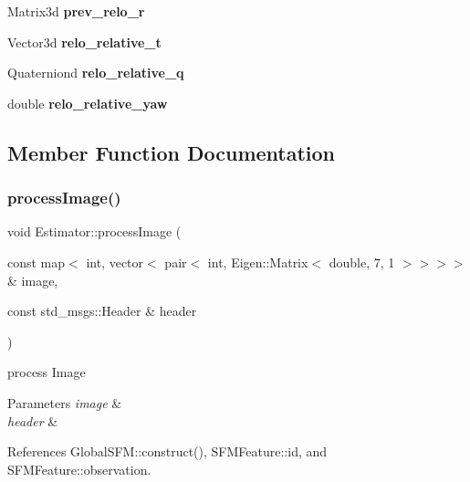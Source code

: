 \begin{DoxyCompactItemize}
\mbox{\label{classEstimator_ad5c0584ee27e037a3a4378a73739c309}} 
Matrix3d {\bfseries prev\+\_\+relo\+\_\+r}
\item 
\mbox{\label{classEstimator_ace6808815c79b92f2a818748e31f3e8b}} 
Vector3d {\bfseries relo\+\_\+relative\+\_\+t}
\item 
\mbox{\label{classEstimator_a5d360d01f5f76bcf1a45ba7b98eda2d4}} 
Quaterniond {\bfseries relo\+\_\+relative\+\_\+q}
\item 
\mbox{\label{classEstimator_afc85fb295cdd4ec9bd851b4f4a591bdd}} 
double {\bfseries relo\+\_\+relative\+\_\+yaw}
\end{DoxyCompactItemize}


\subsection{Member Function Documentation}
\mbox{\label{classEstimator_aa6fb65bc801f80dc142e3a5f9d0109ee}} 
\subsubsection{\texorpdfstring{process\+Image()}{processImage()}}
{\footnotesize\ttfamily void Estimator\+::process\+Image (\begin{DoxyParamCaption}\item[{const map$<$ int, vector$<$ pair$<$ int, Eigen\+::\+Matrix$<$ double, 7, 1 $>$$>$$>$$>$ \&}]{image,  }\item[{const std\+\_\+msgs\+::\+Header \&}]{header }\end{DoxyParamCaption})}



process Image 


\begin{DoxyParams}{Parameters}
{\em image} & \\
\hline
{\em header} & \\
\hline
\end{DoxyParams}


References Global\+S\+F\+M\+::construct(), S\+F\+M\+Feature\+::id, and S\+F\+M\+Feature\+::observation.

